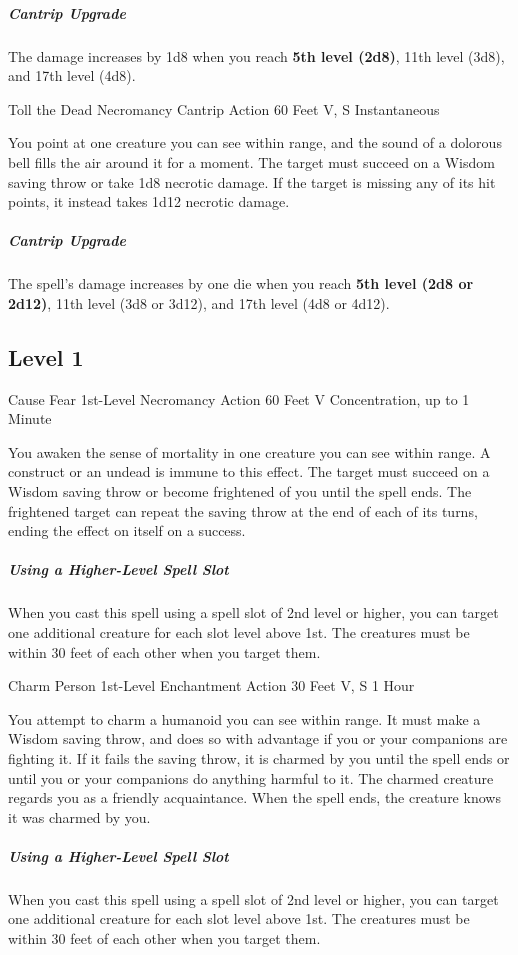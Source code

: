 \documentclass[letterpaper,openany,oneside,twocolumn]{book}
\begin{document}
\subparagraph*{Cantrip Upgrade} The damage increases by 1d8 when you reach \textbf{5th level (2d8)}, 11th level (3d8), and 17th level (4d8).

\DndSpellHeader
  {Toll the Dead}
  {Necromancy Cantrip}
  {Action}
  {60 Feet}
  {V, S}
  {Instantaneous}

You point at one creature you can see within range, and the sound of a dolorous bell fills the air around it for a moment. The target must succeed on a Wisdom saving throw or take 1d8 necrotic damage. If the target is missing any of its hit points, it instead takes 1d12 necrotic damage.

\subparagraph*{Cantrip Upgrade} The spell's damage increases by one die when you reach \textbf{5th level (2d8 or 2d12)}, 11th level (3d8 or 3d12), and 17th level (4d8 or 4d12).

\subsection*{Level 1}

\DndSpellHeader
  {Cause Fear}
  {1st-Level Necromancy}
  {Action}
  {60 Feet}
  {V}
  {Concentration, up to 1 Minute}

You awaken the sense of mortality in one creature you can see within range. A construct or an undead is immune to this effect. The target must succeed on a Wisdom saving throw or become frightened of you until the spell ends. The frightened target can repeat the saving throw at the end of each of its turns, ending the effect on itself on a success.

\subparagraph*{Using a Higher-Level Spell Slot} When you cast this spell using a spell slot of 2nd level or higher, you can target one additional creature for each slot level above 1st. The creatures must be within 30 feet of each other when you target them.

\DndSpellHeader
  {Charm Person}
  {1st-Level Enchantment}
  {Action}
  {30 Feet}
  {V, S}
  {1 Hour}

You attempt to charm a humanoid you can see within range. It must make a Wisdom saving throw, and does so with advantage if you or your companions are fighting it. If it fails the saving throw, it is charmed by you until the spell ends or until you or your companions do anything harmful to it. The charmed creature regards you as a friendly acquaintance. When the spell ends, the creature knows it was charmed by you.

\subparagraph*{Using a Higher-Level Spell Slot} When you cast this spell using a spell slot of 2nd level or higher, you can target one additional creature for each slot level above 1st. The creatures must be within 30 feet of each other when you target them.
\end{document}
